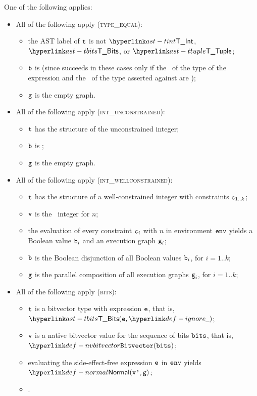 One of the following applies:
\begin{itemize}
  \item All of the following apply (\textsc{type\_equal}):
  \begin{itemize}
    \item the AST label of $\texttt{t}$ is not $\TInt$, $\TBits$, or $\TTuple$;
    \item $\texttt{b}$ is \True (since 
    succeeds in these cases only if the \structure\ of the type of the expression and the \structure\ of the type asserted against are \typeequivalent);
    \item $\texttt{g}$ is the empty graph.
  \end{itemize}

  \item All of the following apply (\textsc{int\_unconstrained}):
  \begin{itemize}
    \item $\texttt{t}$ has the structure of the unconstrained integer;
    \item $\texttt{b}$ is \True;
    \item $\texttt{g}$ is the empty graph.
  \end{itemize}

  \item All of the following apply (\textsc{int\_wellconstrained}):
  \begin{itemize}
    \item $\texttt{t}$ has the structure of a well-constrained integer with constraints $\texttt{c}_{1..k}$;
    \item $\texttt{v}$ is the \nativevalue\  integer for $n$;
    \item the evaluation of every constraint $\texttt{c}_i$ with $n$ in environment $\texttt{env}$
    yields a Boolean value $\texttt{b}_i$ and an execution graph $\texttt{g}_i$\ProseOrError;
    \item $\texttt{b}$ is the Boolean disjunction of all Boolean values $\texttt{b}_i$, for $i=1..k$;
    \item $\texttt{g}$ is the parallel composition of all execution graphs $\texttt{g}_i$, for $i=1..k$;
  \end{itemize}

  \item All of the following apply (\textsc{bits}):
  \begin{itemize}
    \item $\texttt{t}$ is a bitvector type with expression $\texttt{e}$, that is, $\TBits(\ve, \Ignore)$;
    \item $\texttt{v}$ is a native bitvector value for the sequence of bits $\texttt{bits}$, that is, \\ $\nvbitvector(\vbits)$;
    \item evaluating the side-effect-free expression $\texttt{e}$ in $\texttt{env}$ yields $\Normal(\vvp, \vg)$\ProseOrError;
    \item {}.
  \end{itemize}


\end{itemize}
